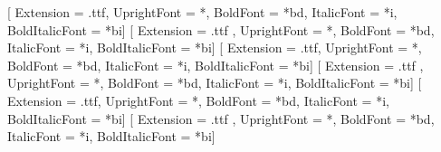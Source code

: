 \ifxetexorluatex
    \setmainlanguage[babelshorthands=true]{russian}  %
    \setmonofont{cour}[                     %
        Extension = .ttf,
        UprightFont = *,
        BoldFont = *bd,
        ItalicFont = *i,
        BoldItalicFont = *bi]
    \newfontfamily{}[    %
        Extension = .ttf ,
        UprightFont = *,
        BoldFont = *bd,
        ItalicFont = *i,
        BoldItalicFont = *bi]
    \ifXeTeX
    \else
    \fi
    \setmainfont{times}[                    %
        Extension = .ttf,
        UprightFont = *,
        BoldFont = *bd,
        ItalicFont = *i,
        BoldItalicFont = *bi]
    \newfontfamily{}[     %
        Extension = .ttf ,
        UprightFont = *,
        BoldFont = *bd,
        ItalicFont = *i,
        BoldItalicFont = *bi]
    \setsansfont{arial}[                    %
        Extension = .ttf,
        UprightFont = *,
        BoldFont = *bd,
        ItalicFont = *i,
        BoldItalicFont = *bi]
    \newfontfamily{}[   %
        Extension = .ttf ,
        UprightFont = *,
        BoldFont = *bd,
        ItalicFont = *i,
        BoldItalicFont = *bi]
\else
\fi



